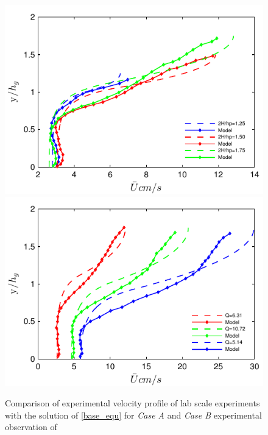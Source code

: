 \documentclass[12pt]{report}   %
\begin{document}
\begin{figure}
 \centerline{\includegraphics[]{Vivoni_Fig3_6_zero_shear_match} \includegraphics{Vivoni_Fig3_7_zero_shear_match}}
 \caption{Comparison of experimental velocity profile of lab scale experiments with the solution of \eqref{base_equ} for \textit{Case A } and \textit{Case B} experimental observation of \cite{Vivoni98} }
 \label{VivoniFig}
\end{figure}
\end{document}
